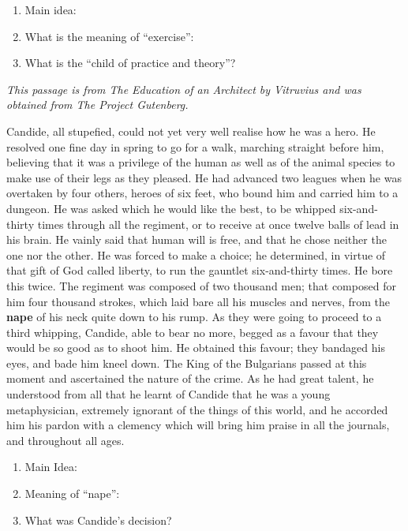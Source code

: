 \documentclass[12pt]{book}
\renewcommand{\indent}{\hspace{1cm}}
\begin{document}
\begin{enumerate}
\item Main idea: \hrulefill
\item What is the meaning of ``exercise'': \hrulefill
\item What is the ``child of practice and theory''? \hrulefill
\end{enumerate}

\textit{This passage is from The Education of an Architect by Vitruvius and was obtained from The Project Gutenberg.}

\bigskip
\begin{linenumbers*}
\modulolinenumbers[5]
\indent Candide, all stupefied, could not yet very well realise how he was a hero. He resolved one fine day in spring to go for a walk, marching straight before him, believing that it was a privilege of the human as well as of the animal species to make use of their legs as they pleased. He had advanced two leagues when he was overtaken by four others, heroes of six feet, who bound him and carried him to a dungeon. He was asked which he would like the best, to be whipped six-and-thirty times through all the regiment, or to receive at once twelve balls of lead in his brain. He vainly said that human will is free, and that he chose neither the one nor the other. He was forced to make a choice; he determined, in virtue of that gift of God called liberty, to run the gauntlet six-and-thirty times. He bore this twice. The regiment was composed of two thousand men; that composed for him four thousand strokes, which laid bare all his muscles and nerves, from the \textbf{nape} of his neck quite down to his rump. As they were going to proceed to a third whipping, Candide, able to bear no more, begged as a favour that they would be so good as to shoot him. He obtained this favour; they bandaged his eyes, and bade him kneel down. The King of the Bulgarians passed at this moment and ascertained the nature of the crime. As he had great talent, he understood from all that he learnt of Candide that he was a young metaphysician, extremely ignorant of the things of this world, and he accorded him his pardon with a clemency which will bring him praise in all the journals, and throughout all ages.
\end{linenumbers*}

\begin{enumerate}
\item Main Idea: \hrulefill
\item Meaning of ``nape'': \hrulefill
\item What was Candide's decision? \hrulefill
\end{enumerate}
\end{document}

